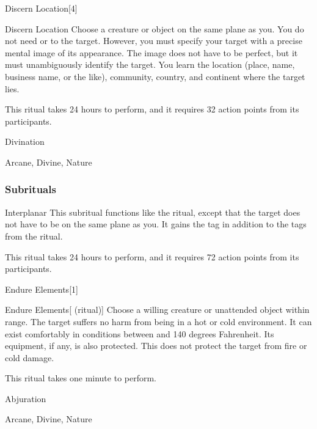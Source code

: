 \begin{spellsection}{Discern Location}[4]


\begin{ability}{Discern Location}
Choose a creature or object on the same plane as you.
You do not need  or  to the target.
However, you must specify your target with a precise mental image of its appearance.
The image does not have to be perfect, but it must unambiguously identify the target.
You learn the location (place, name, business name, or the like), community, country, and continent where the target lies.

This ritual takes 24 hours to perform, and it requires 32 action points from its participants.
\end{ability}




 Divination

 Arcane, Divine, Nature
\end{spellsection}


\subsubsection{Subrituals}


\begin{ability}[\nth{6}]{Interplanar}
This subritual functions like the  ritual, except that the target does not have to be on the same plane as you.
It gains the  tag in addition to the tags from the  ritual.

This ritual takes 24 hours to perform, and it requires 72 action points from its participants.
\end{ability}
\vspace{0.25em}


\begin{spellsection}{Endure Elements}[1]


\begin{ability}{Endure Elements}[ (ritual)]
Choose a willing creature or unattended object within \rngclose range.
The target suffers no harm from being in a hot or cold environment.
It can exist comfortably in conditions between  and 140 degrees Fahrenheit.
Its equipment, if any, is also protected.
This does not protect the target from fire or cold damage.

This ritual takes one minute to perform.
\end{ability}




 Abjuration

 Arcane, Divine, Nature
\end{spellsection}


